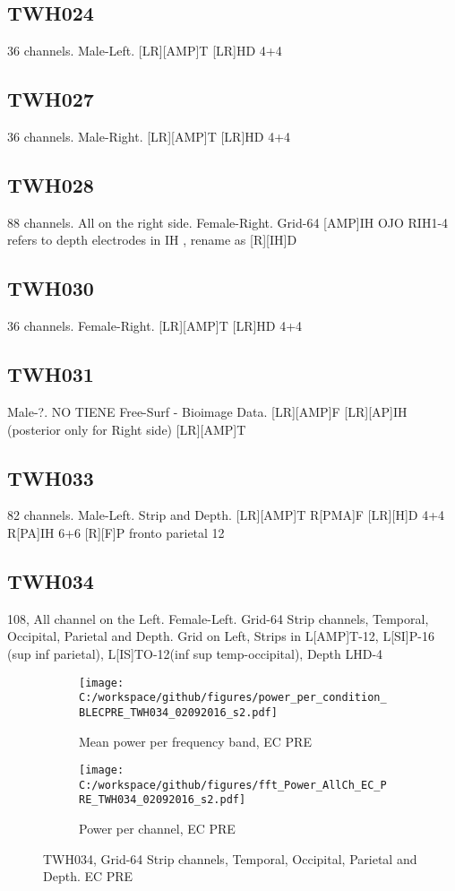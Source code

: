 \documentclass[11pt, onecolumn]{article}
\begin{document}
{\subsection{TWH024}
36 channels. Male-Left.
[LR][AMP]T
[LR]HD 4+4 
\subsection{TWH027}
36 channels. Male-Right.
[LR][AMP]T
[LR]HD 4+4 
\subsection{TWH028}
88 channels. All on the right side. Female-Right.
Grid-64
[AMP]IH
OJO RIH1-4 refers to depth electrodes in IH , rename as 
[R][IH]D

\subsection{TWH030}
36 channels. Female-Right.
[LR][AMP]T
[LR]HD 4+4
\subsection{TWH031}
Male-?. NO TIENE Free-Surf - Bioimage Data.
[LR][AMP]F
[LR][AP]IH  (posterior only for Right side)
[LR][AMP]T
\subsection{TWH033}
82 channels. Male-Left. Strip and Depth. 
[LR][AMP]T
R[PMA]F
[LR][H]D  4+4
R[PA]IH  6+6
[R][F]P fronto parietal  12

\subsection{TWH034}
108, All channel on the Left. Female-Left. Grid-64 Strip channels, Temporal, Occipital, Parietal and Depth.
Grid on Left, Strips in L[AMP]T-12, L[SI]P-16 (sup inf parietal), L[IS]TO-12(inf sup temp-occipital), Depth LHD-4

\begin{figure}[t!] %
\begin{subfigure}{0.48\textwidth}
\texttt{[image: C:/workspace/github/figures/power\_per\_condition\_BLECPRE\_TWH034\_02092016\_s2.pdf]}
\caption{Mean power per frequency band, EC PRE} \label{fig:a}
\end{subfigure}\hspace*{\fill}
\begin{subfigure}{0.48\textwidth}
\texttt{[image: C:/workspace/github/figures/fft\_Power\_AllCh\_EC\_PRE\_TWH034\_02092016\_s2.pdf]}
\caption{Power per channel, EC PRE} \label{fig:b}
\end{subfigure}
\caption{TWH034, Grid-64 Strip channels, Temporal, Occipital, Parietal and Depth. EC PRE} \label{fig:34PRE}
\end{figure}


}
\end{document}
